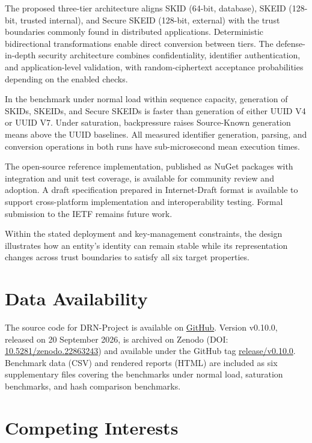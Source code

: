 \documentclass[a4paper,fleqn]{cas-sc}
\begin{document}
The proposed three-tier architecture aligns SKID (64-bit, database),
SKEID (128-bit, trusted internal), and Secure SKEID (128-bit, external)
with the trust boundaries commonly found in distributed applications.
Deterministic bidirectional transformations enable direct conversion
between tiers. The defense-in-depth security architecture combines
confidentiality, identifier authentication, and application-level
validation, with random-ciphertext acceptance probabilities depending on
the enabled checks.

In the benchmark under normal load within sequence capacity, generation
of SKIDs, SKEIDs, and Secure SKEIDs is faster than generation of either
UUID V4 or UUID V7. Under saturation, backpressure raises Source-Known
generation means above the UUID baselines. All measured identifier
generation, parsing, and conversion operations in both runs have
sub-microsecond mean execution times.

The open-source reference implementation, published as NuGet packages
with integration and unit test coverage, is available for community
review and adoption. A draft specification prepared in Internet-Draft
format is available \citep{draft-skid} to support cross-platform
implementation and interoperability testing. Formal submission to the
IETF remains future work.

Within the stated deployment and key-management constraints, the design
illustrates how an entity's identity can remain stable while its
representation changes across trust boundaries to satisfy all six target
properties.

\section*{Data Availability}\label{data-availability}

The source code for DRN-Project is available on
\href{https://github.com/duranserkan/DRN-Project}{GitHub}. Version
v0.10.0, released on 20 September 2026, is archived on Zenodo (DOI:
\href{https://doi.org/10.5281/zenodo.22863243}{10.5281/zenodo.22863243})
and available under the GitHub tag
\href{https://github.com/duranserkan/DRN-Project/tree/release/v0.10.0}{release/v0.10.0}.
Benchmark data (CSV) and rendered reports (HTML) are included as six
supplementary files covering the benchmarks under normal load,
saturation benchmarks, and hash comparison benchmarks.

\section*{Competing Interests}\label{competing-interests}
\end{document}
